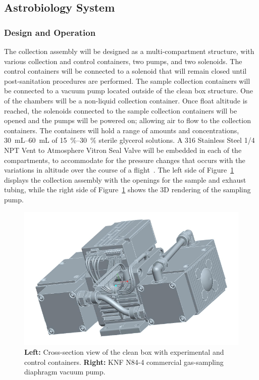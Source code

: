\subsection{Astrobiology System}
\label{sec:AstrobiologySystem}

\subsubsection{Design and Operation}
The collection assembly will be designed as a multi-compartment structure, with various collection and control containers, two pumps, and two solenoids.  The control containers will be connected to a solenoid that will remain closed until post-sanitation procedures are performed. The sample collection containers will be connected to a vacuum pump located outside of the clean box structure.  One of the chambers will be a non-liquid collection container. Once float altitude is reached, the solenoids connected to the sample collection containers will be opened and the pumps will be powered on; allowing air to flow to the collection containers. The containers will hold a range of amounts and concentrations, \SIrange{30}{60}{\milli\liter} of \SIrange{15}{30}{\%} sterile glycerol solutions. A 316 Stainless Steel \SI{1/4}{\inch} NPT Vent to Atmosphere Vitron Seal Valve will be embedded in each of the compartments, to accommodate for the pressure changes that occurs with the variations in altitude over the course of a flight~\cite{valve}.  The left side of Figure~\ref{fig:Pump} displays the collection assembly with the openings for the sample and exhaust tubing, while the right side of Figure~\ref{fig:Pump} shows the 3D rendering of the sampling pump.  

\begin{figure}[!h] 
\begin{center}
\includegraphics[scale=.8]{./Figures/Pump.pdf}
\caption{{\bf Left:} Cross-section view of the clean box with experimental and control containers. {\bf Right:} KNF N84-4 commercial gas-sampling diaphragm vacuum pump. }
\label{fig:Pump}
\end{center}
\end{figure} 

